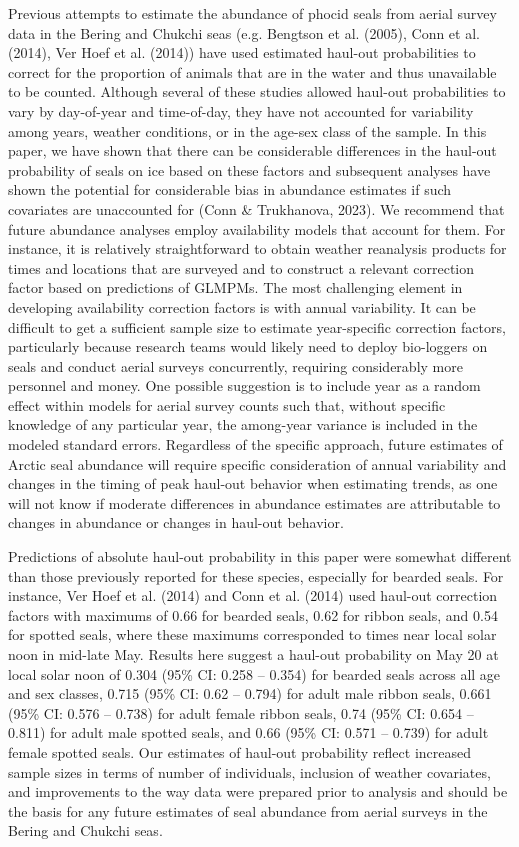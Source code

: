 \documentclass[fleqn,10pt,lineno]{wlpeerj} %
\begin{document}
Previous attempts to estimate the abundance of phocid seals from aerial survey
data in the Bering and Chukchi seas (e.g. Bengtson et al. (2005), Conn et al. (2014),
Ver Hoef et al. (2014)) have used estimated haul-out probabilities to correct for the
proportion of animals that are in the water and thus unavailable to be counted.
Although several of these studies allowed haul-out probabilities to vary by
day-of-year and time-of-day, they have not accounted for variability among
years, weather conditions, or in the age-sex class of the sample. In this paper,
we have shown that there can be considerable differences in the haul-out
probability of seals on ice based on these factors and subsequent analyses have
shown the potential for considerable bias in abundance estimates if such
covariates are unaccounted for (Conn \& Trukhanova, 2023). We recommend that future abundance
analyses employ availability models that account for them. For instance, it is
relatively straightforward to obtain weather reanalysis products for times and
locations that are surveyed and to construct a relevant correction factor based
on predictions of GLMPMs. The most challenging element in developing
availability correction factors is with annual variability. It can be difficult
to get a sufficient sample size to estimate year-specific correction factors,
particularly because research teams would likely need to deploy bio-loggers on
seals and conduct aerial surveys concurrently, requiring considerably more
personnel and money. One possible suggestion is to include year as a random
effect within models for aerial survey counts such that, without specific
knowledge of any particular year, the among-year variance is included in the
modeled standard errors. Regardless of the specific approach, future estimates
of Arctic seal abundance will require specific consideration of annual
variability and changes in the timing of peak haul-out behavior when estimating
trends, as one will not know if moderate differences in abundance estimates are
attributable to changes in abundance or changes in haul-out behavior.

Predictions of absolute haul-out probability in this paper were somewhat
different than those previously reported for these species, especially for
bearded seals. For instance, Ver Hoef et al. (2014) and Conn et al.
(2014) used haul-out correction factors with maximums of 0.66 for bearded
seals, 0.62 for ribbon seals, and 0.54 for spotted seals, where these maximums
corresponded to times near local solar noon in mid-late May. Results here
suggest a haul-out probability on May 20 at local solar noon of 0.304
(95\% CI: 0.258 -- 0.354)
for bearded seals across all age and sex classes,
0.715
(95\% CI: 0.62 -- 0.794) for
adult male ribbon seals, 0.661
(95\% CI: 0.576 -- 0.738) for
adult female ribbon seals, 0.74
(95\% CI: 0.654 -- 0.811) for
adult male spotted seals, and 0.66
(95\% CI: 0.571 -- 0.739) for
adult female spotted seals. Our estimates
of haul-out probability reflect increased sample sizes in terms of
number of individuals, inclusion of weather covariates, and improvements to the
way data were prepared prior to analysis and should be the basis for any
future estimates of seal abundance from aerial surveys in the Bering and
Chukchi seas.
\end{document}
